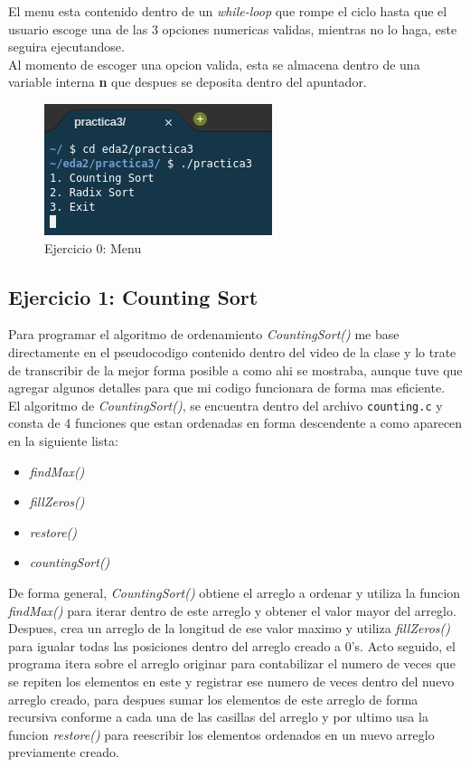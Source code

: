\documentclass{article}
\begin{document}
			El menu esta contenido dentro de un \emph{while-loop} que rompe el ciclo hasta que el usuario escoge una de las 3 opciones numericas validas, mientras no lo haga, este seguira ejecutandose.\\
			
			Al momento de escoger una opcion valida, esta se almacena dentro de una variable interna \textbf{n} que despues se deposita dentro del apuntador.
			
			\begin{figure}[H]
				\centering
				\includegraphics[scale = 1]{images/m1.png}
				\caption*{Ejercicio 0: Menu}
			\end{figure} 
			
		\newpage
			
		\subsection{Ejercicio 1: Counting Sort}
		
			Para programar el algoritmo de ordenamiento \emph{CountingSort()} me base directamente en el pseudocodigo contenido dentro del video de la clase y lo trate de transcribir de la mejor forma posible a como ahi se mostraba, aunque tuve que agregar algunos detalles para que mi codigo funcionara de forma mas eficiente.\\
			
			El algoritmo de \emph{CountingSort()}, se encuentra dentro del archivo \verb|counting.c| y consta de 4 funciones que estan ordenadas en forma descendente a como aparecen en la siguiente lista:
			
			\begin{itemize}
				\item \emph{findMax()}
				\item \emph{fillZeros()}
				\item \emph{restore()}
				\item \emph{countingSort()}
			\end{itemize}
		
			De forma general, \emph{CountingSort()} obtiene el arreglo a ordenar y utiliza la funcion \emph{findMax()} para iterar dentro de este arreglo y obtener el valor mayor del arreglo. Despues, crea un arreglo de la longitud de ese valor maximo y utiliza \emph{fillZeros()} para igualar todas las posiciones dentro del arreglo creado a 0's. Acto seguido, el programa itera sobre el arreglo originar para contabilizar el numero de veces que se repiten los elementos en este y registrar ese numero de veces dentro del nuevo arreglo creado, para despues sumar los elementos de este arreglo de forma recursiva conforme a cada una de las casillas del arreglo y por ultimo usa la funcion \emph{restore()} para reescribir los elementos ordenados en un nuevo arreglo previamente creado.\\
			
\end{document}
